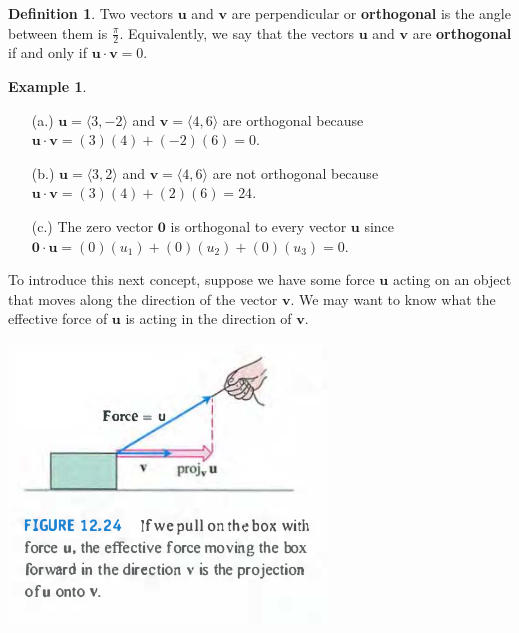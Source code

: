 \documentclass[12pt, letter]{article}
\theoremstyle{plain}
\numberwithin{theorem}{section}
\theoremstyle{definition}
\newtheorem{definition}[theorem]{Definition}
\newtheorem{example}[theorem]{Example}
\begin{document}
\begin{definition}
Two vectors $\bm{u}$ and $\bm{v}$ are perpendicular or \textbf{orthogonal} is the angle between them is $\frac{\pi}{2}$. Equivalently, we say that the vectors $\bm{u}$ and $\bm{v}$ are \textbf{orthogonal} if and only if $\bm{u}\cdot\bm{v} = 0$.
\end{definition}

\bigskip

\hrulefill

\bigskip

\begin{example}
\begin{itemize}
\item[(a.)] $\bm{u} = \langle 3, -2 \rangle$ and $\bm{v} = \langle 4, 6 \rangle$ are orthogonal because $\bm{u} \cdot \bm{v} = (3)(4) + (-2)(6) = 0$.
\item[(b.)] $\bm{u} = \langle 3, 2 \rangle$ and $\bm{v} = \langle 4, 6 \rangle$ are not orthogonal because $\bm{u} \cdot \bm{v} = (3)(4) + (2)(6) = 24$.
\item[(c.)] The zero vector $\bm{0}$ is orthogonal to every vector $\bm{u}$ since $\bm{0} \cdot\bm{u} = (0)(u_1)+(0)(u_2)+(0)(u_3) = 0$.
\end{itemize}
\end{example}

\bigskip

\hrulefill

\bigskip

To introduce this next concept, suppose we have some force $\bm{u}$ acting on an object that moves along the direction of the vector $\bm{v}$. We may want to know what the effective force of $\bm{u}$ is acting in the direction of $\bm{v}$.

\bigskip

\begin{center}
\includegraphics[scale=0.8]{m1_f9}
\end{center}
\end{document}
